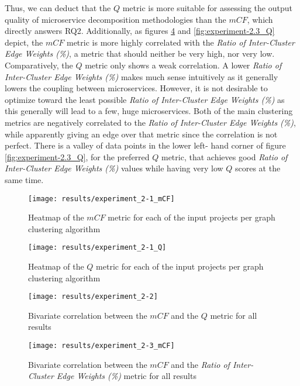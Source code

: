 \documentclass[12pt,a4paper]{report}
\begin{document}
Thus, we can deduct that the $Q$ metric is more suitable for assessing the
output quality of microservice decomposition methodologies than the $mCF$,
which directly answers RQ2. Additionally, as figures \ref{fig:experiment-2.3_mCF}
and \ref{fig:experiment-2.3_Q} depict, the $mCF$ metric is more highly
correlated with the \textit{Ratio of Inter-Cluster Edge Weights (\%)}, a metric
that should neither be very high, nor very low. Comparatively, the $Q$ metric
only shows a weak correlation. A lower \textit{Ratio of Inter-Cluster Edge
Weights (\%)} makes much sense intuitively as it generally lowers the coupling
between microservices. However, it is not desirable to optimize toward the
least possible \textit{Ratio of Inter-Cluster Edge Weights (\%)} as this
generally will lead to a few, huge microservices. Both of the main clustering
metrics are negatively correlated to the \textit{Ratio of Inter-Cluster Edge
Weights (\%)}, while apparently giving an edge over that metric since the
correlation is not perfect. There is a valley of data points in the lower left-
hand corner of figure \ref{fig:experiment-2.3_Q}, for the preferred $Q$ metric,
that achieves good \textit{Ratio of Inter-Cluster Edge Weights (\%)} values
while having very low $Q$ scores at the same time.

\begin{figure}[htbp]
\centering
\texttt{[image: results/experiment\_2-1\_mCF]}
\caption{Heatmap of the $mCF$ metric for each of the input projects per graph clustering algorithm}
\label{fig:experiment-2.1_mCF}
\end{figure}

\begin{figure}[htbp]
\centering
\texttt{[image: results/experiment\_2-1\_Q]}
\caption{Heatmap of the $Q$ metric for each of the input projects per graph clustering algorithm}
\label{fig:experiment-2.1_Q}
\end{figure}

\begin{figure}[htbp]
\centering
\texttt{[image: results/experiment\_2-2]}
\caption{Bivariate correlation between the $mCF$ and the $Q$ metric for all results}
\label{fig:experiment-2.2}
\end{figure}

\begin{figure}[htbp]
\centering
\texttt{[image: results/experiment\_2-3\_mCF]}
\caption{Bivariate correlation between the $mCF$ and the \textit{Ratio of Inter-Cluster Edge Weights (\%)} metric for all results}
\label{fig:experiment-2.3_mCF}
\end{figure}
\end{document}
